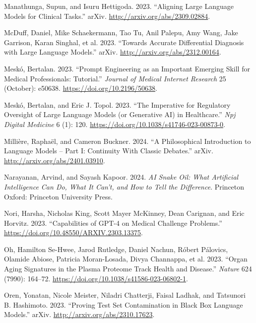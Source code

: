 \documentclass[
  Letterpaper,
]{scrbook}
\newlength{\cslhangindent}
\newenvironment{CSLReferences}[2] %
 {\begin{list}{}{%
  \setlength{\itemindent}{0pt}
  \setlength{\leftmargin}{0pt}
  \setlength{\parsep}{0pt}
  \ifodd #1
   \setlength{\leftmargin}{\cslhangindent}
   \setlength{\itemindent}{-1\cslhangindent}
  \fi
  \setlength{\itemsep}{#2\baselineskip}}}
 {\end{list}}
\begin{document}
\begin{CSLReferences}{1}{0}
Manathunga, Supun, and Isuru Hettigoda. 2023. {``Aligning {Large}
{Language} {Models} for {Clinical} {Tasks}.''} arXiv.
\url{http://arxiv.org/abs/2309.02884}.

McDuff, Daniel, Mike Schaekermann, Tao Tu, Anil Palepu, Amy Wang, Jake
Garrison, Karan Singhal, et al. 2023. {``Towards {Accurate}
{Differential} {Diagnosis} with {Large} {Language} {Models}.''} arXiv.
\url{http://arxiv.org/abs/2312.00164}.

Meskó, Bertalan. 2023. {``Prompt {Engineering} as an {Important}
{Emerging} {Skill} for {Medical} {Professionals}: {Tutorial}.''}
\emph{Journal of Medical Internet Research} 25 (October): e50638.
\url{https://doi.org/10.2196/50638}.

Meskó, Bertalan, and Eric J. Topol. 2023. {``The Imperative for
Regulatory Oversight of Large Language Models (or Generative {AI}) in
Healthcare.''} \emph{Npj Digital Medicine} 6 (1): 120.
\url{https://doi.org/10.1038/s41746-023-00873-0}.

Millière, Raphaël, and Cameron Buckner. 2024. {``A {Philosophical}
{Introduction} to {Language} {Models} -- {Part} {I}: {Continuity} {With}
{Classic} {Debates}.''} arXiv. \url{http://arxiv.org/abs/2401.03910}.

Narayanan, Arvind, and Sayash Kapoor. 2024. \emph{{AI} Snake Oil: What
Artificial Intelligence Can Do, What It Can't, and How to Tell the
Difference}. Princeton Oxford: Princeton University Press.

Nori, Harsha, Nicholas King, Scott Mayer McKinney, Dean Carignan, and
Eric Horvitz. 2023. {``Capabilities of {GPT}-4 on {Medical} {Challenge}
{Problems}.''} \url{https://doi.org/10.48550/ARXIV.2303.13375}.

Oh, Hamilton Se-Hwee, Jarod Rutledge, Daniel Nachun, Róbert Pálovics,
Olamide Abiose, Patricia Moran-Losada, Divya Channappa, et al. 2023.
{``Organ Aging Signatures in the Plasma Proteome Track Health and
Disease.''} \emph{Nature} 624 (7990): 164--72.
\url{https://doi.org/10.1038/s41586-023-06802-1}.

Oren, Yonatan, Nicole Meister, Niladri Chatterji, Faisal Ladhak, and
Tatsunori B. Hashimoto. 2023. {``Proving {Test} {Set} {Contamination} in
{Black} {Box} {Language} {Models}.''} arXiv.
\url{http://arxiv.org/abs/2310.17623}.


\end{CSLReferences}
\end{document}
